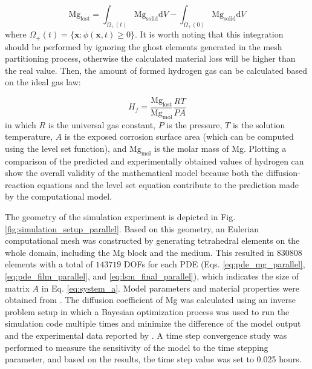 \begin{equation} \label{eq:mass_loss_parallel}
\mathrm{Mg}_{\mathrm{lost}}=\int_{\Omega_{+}(t)} \mathrm{Mg}_{\mathrm{solid}} \mathrm{d} V-\int_{\Omega_{+}(0)} \mathrm{Mg}_{\mathrm{solid}} \mathrm{d} V
\end{equation}
where $\Omega_{+}(t)=\{\mathbf{x}: \phi(\mathbf{x}, t) \geq 0\}$. It is worth noting that this integration should be performed by ignoring the ghost elements generated in the mesh partitioning process, otherwise the calculated material loss will be higher than the real value. Then, the amount of formed hydrogen gas can be calculated based on the ideal gas law:

\begin{equation} \label{eq:evolv_hydr_parallel}
H_{f}=\frac{\mathrm{Mg}_{\mathrm{lost}}}{\mathrm{Mg}_{\mathrm{mol}}} \frac{R T}{P A}
\end{equation}
in which $R$ is the universal gas constant, $P$ is the pressure, $T$ is the solution temperature, $A$ is the exposed corrosion surface area (which can be computed using the level set function), and $\mathrm{Mg}_{\mathrm{mol}}$ is the molar mass of Mg. Plotting a comparison of the predicted and experimentally obtained values of hydrogen can show the overall validity of the  mathematical model because both the diffusion-reaction equations and the level set equation contribute to the prediction made by the computational model.

The geometry of the simulation experiment is depicted in Fig. \ref{fig:simulation_setup_parallel}. Based on this geometry, an Eulerian computational mesh was constructed by generating tetrahedral elements on the whole domain, including the Mg block and the medium. This resulted in $\num{830808}$ elements with a total of $\num{143719}$ DOFs for each {PDE} (Eqs. \ref{eq:pde_mg_parallel}, \ref{eq:pde_film_parallel}, and \ref{eq:lsm_final_parallel}), which indicates the size of matrix $A$ in Eq. \ref{eq:system_a}. Model parameters and material properties were obtained from \cite{Bajger2016}. The diffusion coefficient of Mg was calculated using an inverse problem setup in which a Bayesian optimization process \cite{Mockus1989} was used to run the simulation code multiple times and minimize the difference of the model output and the experimental data reported by  \cite{Mei2019}. A time step convergence study was performed to measure the sensitivity of the model to the time stepping parameter, and based on the results, the time step value was set to 0.025 hours.

